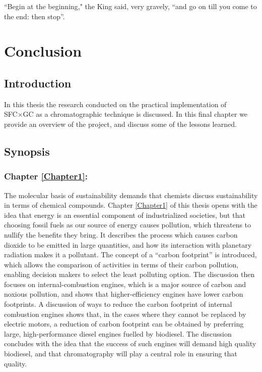 
\begin{savequote}[\quotewidth]
``Begin at the beginning," the King said, very gravely, ``and go on till you come to the end: then stop''.
\end{savequote}

\chapter{Conclusion} %

\label{Chapter9} %

\section{Introduction}


In this thesis the research conducted on the practical implementation of SFC×GC
as a chromatographic technique is discussed. In this final chapter we provide an
overview of the project, and discuss some of the lessons learned.

\section{Synopsis}

\subsection{Chapter \ref{Chapter1}:  }

The molecular basis of sustainability \autocite{Anastas2016} demands that
chemists discuss sustainability in terms of chemical compounds. Chapter
\ref{Chapter1} of this thesis opens with the idea that energy is an essential
component of industrialized societies, but that choosing fossil fuels as our
source of energy causes pollution, which threatens to nullify the benefits they
bring. It describes the process which causes carbon dioxide to be emitted in
large quantities, and how its interaction with planetary radiation makes it a
pollutant. The concept of a ``carbon footprint'' is introduced, which allows the
comparison of activities in terms of their carbon pollution, enabling decision
makers to select the least polluting option. The discussion then focuses on
internal-combustion engines, which is a major source of carbon and noxious
pollution, and shows that higher-efficiency engines have lower carbon
footprints. A discussion of ways to reduce the carbon footprint of internal
combustion engines shows that, in the cases where they cannot be replaced by
electric motors, a reduction of carbon footprint can be obtained by preferring
large, high-performance diesel engines fuelled by biodiesel. The discussion
concludes with the idea that the success of such engines will demand high
quality biodiesel, and that chromatography will play a central role in ensuring
that quality.

